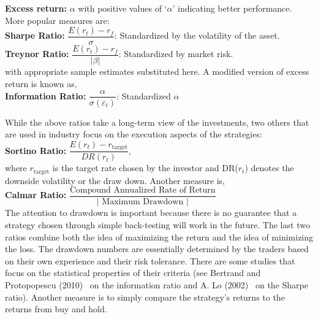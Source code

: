 \noindent\textbf{Excess return: }$\alpha$ with positive values of `$\alpha$' indicating better performance. \\

\noindent More popular measures are:\\

\noindent \textbf{Sharpe Ratio: } $\dfrac{E(r_{t}) - r_f}{\sigma}$: Standardized by the volatility of the asset. \\

\noindent \textbf{Treynor Ratio: } $\dfrac{E(r_{t}) - r_f}{\left|\beta \right|}$: Standardized by market risk. \\

\noindent with appropriate sample estimates substituted here. A modified version of excess return is known as, \\

\noindent \textbf{Information Ratio: } $\dfrac{\alpha}{\sigma(\varepsilon_{t})}$: Standardized $\alpha$

While the above ratios take a long-term view of the investments, two others that are used in industry focus on the execution aspects of the strategies: \\

\noindent \textbf{Sortino Ratio: } $\dfrac{E(r_{t}) - r_{\text{target}}}{DR(r_{t})}$, \\

\noindent where $r_{\text{target}}$ is the target rate chosen by the investor and DR($r_t$) denotes the downside volatility or the draw down. Another measure is, \\

\noindent \textbf{Calmar Ratio: } $\dfrac{\text{Compound Annualized Rate of Return}}{\left| \text{ Maximum Drawdown }\right|}$ \\


The attention to drawdown is important because there is no guarantee that a strategy chosen through simple back-testing will work in the future. The last two ratios combine both the idea of maximizing the return and the idea of minimizing the loss. The drawdown numbers are essentially determined by the traders based on their own experience and their risk tolerance. There are some studies that focus on the statistical properties of their criteria (see Bertrand and Protopopescu (2010)~\cite{bertrand} on the information ratio and A. Lo (2002)~\cite{awlo} on the Sharpe ratio). Another measure is to simply compare the strategy's returns to the returns from buy and hold.


